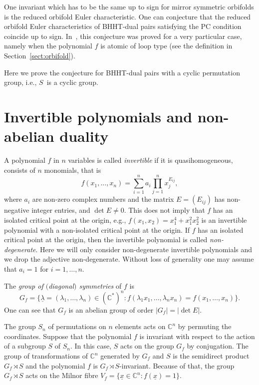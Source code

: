 \documentclass[pdftex]{sigma}
\numberwithin{equation}{section}
\begin{document}
One invariant which has to be the same up to sign for mirror symmetric orbifolds is the reduced orbifold Euler characteristic. One can conjecture that the reduced orbifold Euler characteristics of BHHT-dual pairs satisfying the PC condition coincide up to sign. In~\cite{EG-1811}, this conjecture was proved for a very particular case, namely when the polynomial $f$ is atomic of loop type (see the definition in Section~\ref{sect:orbifold}).

Here we prove the conjecture for BHHT-dual pairs with a cyclic permutation group, i.e., $S$~is a cyclic group.

\section{Invertible polynomials and non-abelian duality} \label{sect:invertible_poly}
A polynomial $f$ in $n$ variables is called {\em invertible} if it is quasihomogeneous, consists of $n$ monomials, that is
\[ f(x_1, \dots , x_n)=\sum_{i=1}^n a_i \prod_{j=1}^n x_j^{E_{ij}} ,
\]
where $a_i$ are non-zero complex numbers and the matrix $E=(E_{ij})$ has non-negative integer entries, and
$\det E \neq 0$. This does not imply that $f$ has an isolated critical point at the origin, e.g., $f(x_1,x_2)=x_1^4+x_1^2x_2^2$ is an invertible polynomial with a non-isolated critical point at the origin. If $f$ has an isolated critical point at the origin, then the invertible polynomial is called {\em non-degenerate}. Here we will only consider non-degenerate invertible polynomials and we drop the adjective non-degenerate. Without loss of generality one may assume
that $a_i=1$ for $i=1, \dots , n$.

The {\em group of $($diagonal$)$ symmetries} of $f$ is
\[
G_f=\big\{\underline{\lambda}=(\lambda_1, \dots, \lambda_n)\in({\mathbb C}^*)^n\colon
f(\lambda_1x_1, \dots, \lambda_nx_n)=f(x_1, \dots, x_n)\big\} .
\]
One can see that $G_f$ is an abelian group of order $\vert G_f \vert = \vert\det E \vert$.

The group $S_n$ of permutations on $n$ elements acts on ${\mathbb C}^n$ by permuting the coordinates. Suppose that the polynomial $f$ is invariant with respect to the action of a subgroup $S$ of $S_n$. In this case, $S$ acts on the group $G_f$ by conjugation. The group of transformations of ${\mathbb C}^n$ generated by $G_f$ and $S$ is the semidirect product $G_f \rtimes S$ and the polynomial $f$ is $G_f \rtimes S$-invariant. Because of that, the group $G_f \rtimes S$ acts on the Milnor fibre $V_f=\big\{ \underline{x} \in {\mathbb C}^n \colon f(\underline{x})=1 \big\}$.
\end{document}
